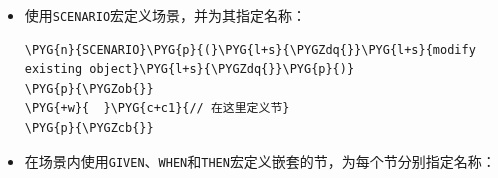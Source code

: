 \begin{itemize}
\item 使用\texttt{SCENARIO}宏定义场景，并为其指定名称：



\begin{codeblockbg}
\begin{Verbatim}[commandchars=\\\{\},breaklines=true,breakanywhere=true,fontsize=\codefont,xleftmargin=17bp]
\PYG{n}{SCENARIO}\PYG{p}{(}\PYG{l+s}{\PYGZdq{}}\PYG{l+s}{modify existing object}\PYG{l+s}{\PYGZdq{}}\PYG{p}{)}
\PYG{p}{\PYGZob{}}
\PYG{+w}{  }\PYG{c+c1}{// 在这里定义节}
\PYG{p}{\PYGZcb{}}
\end{Verbatim}
\end{codeblockbg}



\item 在场景内使用\texttt{GIVEN}、\texttt{WHEN}和\texttt{THEN}宏定义嵌套的节，为每个节分别指定名称：




\end{itemize}
